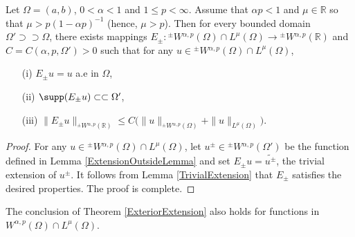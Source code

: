 \documentclass[leqno,final]{siamltex}
\numberwithin{equation}{section}
\renewcommand{\(}{\bigl(}
\renewcommand{\)}{\bigr)}
\newcommand{\R}{\mathbb{R}}
\begin{document}
    \begin{theorem}\label{ExteriorExtension}
         Let $\Omega=(a,b)$, $0 < \alpha <1$ and $1 \leq p < \infty$. Assume that $\alpha p<1$ and $\mu \in \R$ so that $\mu > p(1-\alpha p)^{-1}$ (hence, $\mu>p$). Then for every bounded domain 
        $\Omega ' \supset \supset \Omega$,      
        there exists mappings $E_{\pm} :{^{\pm}}{W}{^{\alpha,p}}(\Omega)\cap L^{\mu}(\Omega) \rightarrow {^{\pm}}{W}{^{\alpha,p}}(\R)$ and $C = C(\alpha,p,\Omega') > 0$ such that for any $u \in {^{\pm}}{W}{^{\alpha,p}}(\Omega) \cap L^{\mu}(\Omega)$, 
        \begin{enumerate}
            \item[{\rm (i)}] $E_{\pm}u = u$ a.e in $\Omega$, 
            \item[{\rm (ii)}] $\supp(E_{\pm}u)\subset\subset \Omega'$,
            \item[{\rm (iii)}] $\|E_{\pm}u\|_{{^{\pm}}{W}{^{\alpha,p}}(\R)} \leq C
            \bigl(\|u\|_{{^{\pm}}{W}{^{\alpha,p}}(\Omega)} + \|u\|_{L^{\mu}(\Omega)} \bigr).$
        \end{enumerate}
    \end{theorem}


    \begin{proof}
    	For any $u \in {^{\pm}}{W}{^{\alpha,p}}(\Omega) \cap L^{\mu}(\Omega)$, let 
    	$u^{\pm} \in {^{\pm}}{W}{^{\alpha,p}}(\Omega')$ be the function defined in 
        Lemma \ref{ExtensionOutsideLemma} and set $E_{\pm}u = \widetilde{u^{\pm}}$, the trivial extension of $u^{\pm}$.
        It follows from  Lemma \ref{TrivialExtension}  that $E_{\pm}$ satisfies the desired properties.
        The proof is complete. 
    \end{proof}

\begin{corollary}
The conclusion of Theorem \ref{ExteriorExtension} also holds for functions in ${W}^{\alpha,p}(\Omega) \cap L^{\mu}(\Omega)$.
\end{corollary} 
\end{document}
